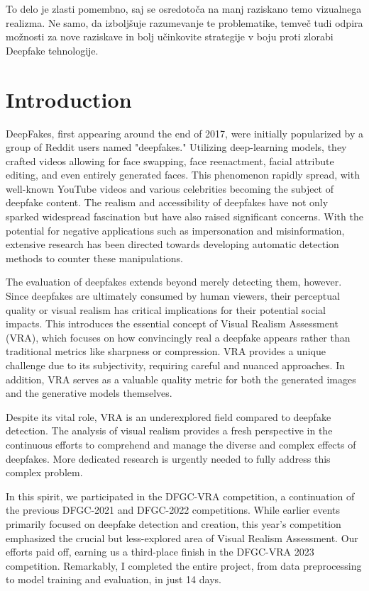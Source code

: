 \documentclass[a4paper,12pt,openright]{book}
\newcommand{\clearemptydoublepage}{\newpage{\pagestyle{empty}\cleardoublepage}}
\begin{document}
To delo je zlasti pomembno, saj se osredotoča na manj raziskano temo vizualnega realizma. Ne samo, da izboljšuje razumevanje te problematike, temveč tudi odpira možnosti za nove raziskave in bolj učinkovite strategije v boju proti zlorabi Deepfake tehnologije.


\bigskip

\clearemptydoublepage


\mainmatter
\setcounter{page}{1}
\pagestyle{fancy}

\chapter{Introduction}
\label{chap:introduction}
DeepFakes, first appearing around the end of 2017, were initially popularized by a group of Reddit users named "deepfakes." Utilizing deep-learning models, they crafted videos allowing for face swapping, face reenactment, facial attribute editing, and even entirely generated faces. This phenomenon rapidly spread, with well-known YouTube videos and various celebrities becoming the subject of deepfake content. The realism and accessibility of deepfakes have not only sparked widespread fascination but have also raised significant concerns. With the potential for negative applications such as impersonation and misinformation, extensive research has been directed towards developing automatic detection methods to counter these manipulations.

The evaluation of deepfakes extends beyond merely detecting them, however. Since deepfakes are ultimately consumed by human viewers, their perceptual quality or visual realism has critical implications for their potential social impacts. This introduces the essential concept of Visual Realism Assessment (VRA), which focuses on how convincingly real a deepfake appears rather than traditional metrics like sharpness or compression. VRA provides a unique challenge due to its subjectivity, requiring careful and nuanced approaches. In addition, VRA serves as a valuable quality metric for both the generated images and the generative models themselves.

Despite its vital role, VRA is an underexplored field compared to deepfake detection. The analysis of visual realism provides a fresh perspective in the continuous efforts to comprehend and manage the diverse and complex effects of deepfakes. More dedicated research is urgently needed to fully address this complex problem.

In this spirit, we participated in the DFGC-VRA competition, a continuation of the previous DFGC-2021 and DFGC-2022 competitions. While earlier events primarily focused on deepfake detection and creation, this year's competition emphasized the crucial but less-explored area of Visual Realism Assessment. Our efforts paid off, earning us a third-place finish in the DFGC-VRA 2023 competition.  Remarkably, I completed the entire project, from data preprocessing to model training and evaluation, in just 14 days.
\end{document}
